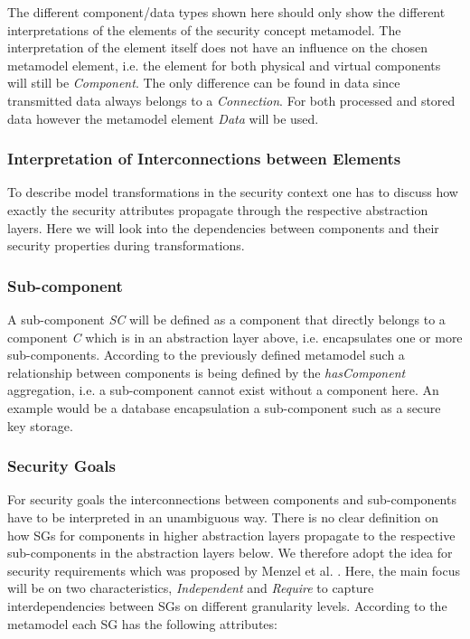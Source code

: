 The different component/data types shown here should only show the different interpretations of the elements of the security concept metamodel. The interpretation of the element itself does not have an influence on the chosen metamodel element, i.e. the element for both physical and virtual components will still be \textit{Component}. The only difference can be found in data since transmitted data always belongs to a \textit{Connection}. For both processed and stored data however the metamodel element \textit{Data} will be used.

\subsubsection{Interpretation of Interconnections between Elements}

To describe model transformations in the security context one has to discuss how exactly the security attributes propagate through the respective abstraction layers. Here we will look into the dependencies between components and their security properties during transformations.

\subsubsection*{Sub-component}

A sub-component \textit{SC} will be defined as a component that directly belongs to a component \textit{C} which is in an abstraction layer above, i.e. encapsulates one or more sub-components. According to the previously defined metamodel such a relationship between components is being defined by the \textit{hasComponent} aggregation, i.e. a sub-component cannot exist without a component here. An example would be a database encapsulation a sub-component such as a secure key storage.   

\subsubsection*{Security Goals}

For security goals the interconnections between components and sub-components have to be interpreted in an unambiguous way. There is no clear definition on how SGs for components in higher abstraction layers propagate to the respective sub-components in the abstraction layers below. We therefore adopt the idea for security requirements which was proposed by Menzel et al. \cite{Menzel2008}. Here, the main focus will be on two characteristics, \textit{Independent} and \textit{Require} to capture interdependencies between SGs on different granularity levels. According to the metamodel each SG has the following attributes:

